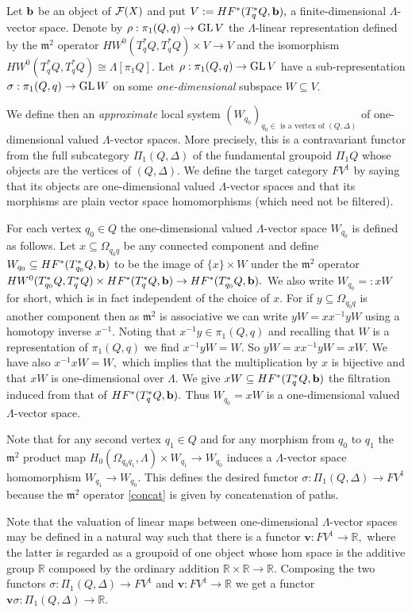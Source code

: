 \documentclass{article}
\theoremstyle{plain}%
\theoremstyle{definition}
\numberwithin{equation}{section}
\numberwithin{figure}{section}
\def\eq{\eqref}
\def\fm{{\mathfrak m}}
\def\GL{\mathop{\rm GL}}
\def\cF{{\mathbin{\cal F}}}
\def\R{{\mathbin{\mathbb R}}}
\def\si{\sigma}
\def\De{\Delta}
\def\La{\Lambda}
\def\Om{\Omega}
\def\sb{\subseteq}
\def\v{{\mathbf{v}}}\def\cl{{\rm cl}}\def\alg{{\rm alg}}\def\geom{{\rm geom}}\def\loc{{\rm loc}}\def\dirlim{\displaystyle\varinjlim}
\begin{document}
Let ${\mathbf{b}}$ be an object of $\cF(X)$ and put $V:=HF^*(T_q^*Q,{\mathbf{b}}),$ a finite-dimensional $\La$-vector space. Denote by $\rho:\pi_1(Q,q)\to \GL V$ the $\La$-linear representation defined by the $\fm^2$ operator $HW^0(T_q^*Q,T_q^*Q)\times V\to V$ and the isomorphism $HW^0(T_q^*Q,T_q^*Q)\cong\La[\pi_1Q].$ Let $\rho:\pi_1(Q,q)\to \GL V$ have a sub-representation $\si:\pi_1(Q,q)\to \GL W$ on some {\it one-dimensional} subspace $W\sb V.$ 

We define then an {\it approximate} local system $(W_{q_0})_{q_0\in\text{ is a vertex of }(Q,\De)}$ of one-dimensional valued $\La$-vector spaces. More precisely, this is a contravariant functor from the full subcategory $\Pi_1(Q,\De)$ of the fundamental groupoid $\Pi_1Q$ whose objects are the vertices of $(Q,\De).$ We define the target category $FV^1$ by saying that its objects are one-dimensional valued $\La$-vector spaces and that its morphisms are plain vector space homomorphisms (which need not be filtered).

For each vertex $q_0\in Q$ the one-dimensional valued $\La$-vector space $W_{q_0}$ is defined as follows. Let $x\sb\Om_{q_0q}$ be any connected component and define $W_{q_0}\sb HF^*(T_{q_0}^*Q,\b)$ to be the image of $\{x\}\times W$ under the $\fm^2$ operator $HW^0(T_{q_0}^*Q,T_q^*Q)\times HF^*(T_q^*Q,{\mathbf{b}})\to HF^*(T_{q_0}^*Q,{\mathbf{b}}).$ We also write $W_{q_0}=:xW$ for short, which is in fact independent of the choice of $x.$ For if $y\sb\Om_{q_0q}$ is another component then as $\fm^2$ is associative we can write $yW=xx^{-1}yW$ using a homotopy inverse $x^{-1}.$ Noting that $x^{-1}y\in \pi_1(Q,q)$ and recalling that $W$ is a representation of $\pi_1(Q,q)$ we find $x^{-1}y W=W.$ So $yW=xx^{-1}yW=xW.$ We have also $x^{-1}xW=W,$ which implies that the multiplication by $x$ is bijective and that $xW$ is one-dimensional over $\La.$ We give $xW\sb HF^*(T_q^*Q,\b)$ the filtration induced from that of $HF^*(T_q^*Q,{\mathbf{b}}).$ Thus $W_{q_0}=xW$ is a one-dimensional valued $\La$-vector space.

Note that for any second vertex $q_1\in Q$ and for any morphism from $q_0$ to $q_1$ the $\fm^2$ product map $H_0(\Om_{q_0q_1},\La)\times W_{q_1}\to W_{q_0}$ induces a $\La$-vector space homomorphism $W_{q_1}\to W_{q_0}.$ This defines the desired functor $\si:\Pi_1(Q,\De)\to FV^1$ because the $\fm^2$ operator \eq{concat} is given by concatenation of paths.

Note that the valuation of linear maps between one-dimensional $\La$-vector spaces may be defined in a natural way such that there is a functor $\v:FV^1\to\R,$ where the latter is regarded as a groupoid of one object whose hom space is the additive group $\R$ composed by the ordinary addition $\R\times\R\to\R.$  Composing the two functors $\si:\Pi_1(Q,\De)\to FV^1$ and $\v:FV^1\to\R$ we get a functor $\v\si:\Pi_1(Q,\De)\to\R.$ 
\end{document}

